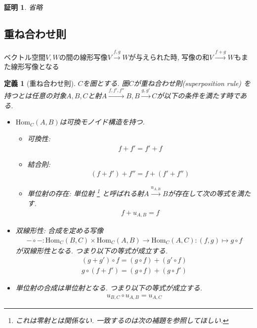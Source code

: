 \documentclass[a4paper,12pt]{ltjsarticle}
\theoremstyle{break}
\newtheorem{defn}[thm]{定義}
\newtheorem*{prf}{証明}
\newcommand{\Hom}{\mathrm{Hom}}
\newcommand{\xr}[1]{\xrightarrow{#1}}
\newcommand{\ci}{\circ}
\newcommand{\ti}{\times}
\numberwithin{equation}{section}
\begin{document}
\begin{prf}
  省略
\end{prf}

\subsection{重ね合わせ則}

ベクトル空間$V,W$の間の線形写像$V \xr{f,g} W$が与えられた時, 写像の和$V \xr{f+g} W$もまた線形写像となる

\begin{defn}[重ね合わせ則]
  $C$を圏とする. 
  圏$C$が重ね合わせ則(superposition rule)
  を持つとは任意の対象$A,B,C$と射$A \xr{f,f',f''} B, B \xr{g,g'} C$が以下の条件を満たす時である.   
  \begin{itemize}
  \item $\Hom_C(A,B)$は可換モノイド構造を持つ. 
  \begin{itemize}
    \item 可換性: \begin{align*} f+f'=f'+f \end{align*}
    \item 結合則: \begin{align*} (f+f')+f''=f+(f'+f'') \end{align*}
    \item 単位射の存在: 単位射
    \footnote{
      これは零射とは関係ない. 一致するのは次の補題を参照してほしい. 
      }
    と呼ばれる射$A \xr{u_{A,B}} B$が存在して次の等式を満たす. 
    \begin{align*} f+u_{A,B}=f \end{align*}
  \end{itemize}
  \item 双線形性: 合成を定める写像
    \begin{align*} 
      - \ci -: \Hom_C(B,C) \ti \Hom_C(A,B) \to \Hom_C(A,C): (f,g) \mapsto g \ci f 
    \end{align*}
    が双線形性となる. 
    つまり以下の等式が成立する. 
    \begin{align*}
      (g+g') \ci f=(g \ci f)+(g' \ci f) \\ 
      g \ci (f+f')=(g \ci f)+(g \ci f') 
    \end{align*}
  \item 単位射の合成は単位射となる. 
  つまり以下の等式が成立する. 
    \begin{align*} 
      u_{B,C} \ci u_{A,B} = u_{A,C} 
    \end{align*}
  \end{itemize}
\end{defn}  
\end{document}
